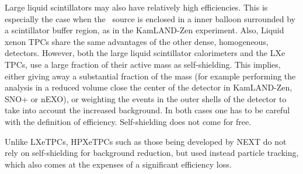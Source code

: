 %
Large liquid scintillators may also have relatively high efficiencies. This is especially the case when the \bb\ source is enclosed in a inner balloon surrounded by a scintillator buffer region, as in the KamLAND-Zen experiment. Also,
%
Liquid xenon TPCs share the same advantages of the other dense, homogeneous, detectors. However, both the large liquid scintillator calorimeters and the LXe TPCs, use a large fraction of their active mass as self-shielding. This implies, either giving away a substantial fraction of the mass (for example performing the analysis in a reduced volume close the center of the detector in KamLAND-Zen, SNO+ or nEXO), or weighting the events in the outer shells of the detector to take into account the increased background. In both cases one has to be careful with the definition of efficiency. Self-shielding does not come for free.  

Unlike LXeTPCs, HPXeTPCs such as those being developed by NEXT do not rely on self-shielding for background reduction, but used instead particle tracking, which also comes at the expenses of a significant efficiency loss.


